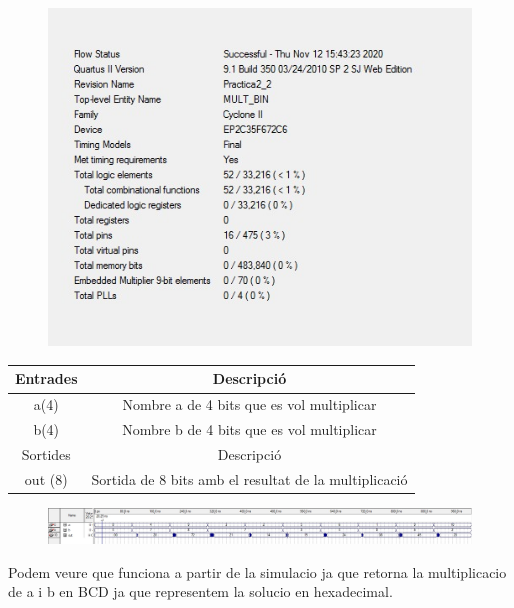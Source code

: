 \documentclass[12pt, a4papre]{article}
\begin{document}
	\begin{figure}[H]
		\begin{center}
		\includegraphics[width=130mm]{informeMULT.jpeg}
		\end{center}
	\end{figure}
	
	\begin{table}[h!]
		\centering
		 \begin{tabular}{|c | c|} 
			 \hline
			 Entrades & Descripció\\ [0.5ex] 
			 \hline
			 a(4) &  Nombre a de 4 bits que es vol multiplicar\\ 
			 b(4) &  Nombre b de 4 bits que es vol multiplicar\\ 
			 \hline\hline
			 Sortides & Descripció\\ [0.5ex] 
			 \hline
			out (8) & Sortida de 8 bits amb el resultat de la multiplicació\\ 
			 \hline
		 \end{tabular}
	\end{table}
	
	\begin{figure}[H]
		\begin{center}
		\includegraphics[width=130mm]{SimMult.jpeg}
		\end{center}
	\end{figure}
	
	Podem veure que funciona a partir de la simulacio ja que retorna la multiplicacio de a i b en BCD ja que representem la solucio en hexadecimal.
	
\end{document}
